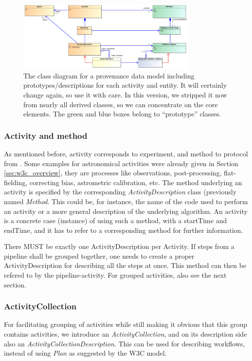 \begin{figure}
\centering
\includegraphics[width=0.8\textwidth]{ProvDM-classdiagram-prototypes.png}
\caption{The class diagram for a provenance data model including prototypes/descriptions for each activity and entity. It will certainly change again, so use it with care. In this version, we stripped it now from nearly all derived classes, so we can concentrate on the core elements. The green and blue boxes belong to ``prototype'' classes.}
\label{fig:classes-prototypes}
\end{figure}


\subsubsection{Activity and method}
As mentioned before, activity corresponds to experiment, and method to protocol from \cite{std:SimDM}.
Some examples for astronomical activities were already given in Section \ref{sec:w3c_overview}, they are processes like observations, post-processing, flat-fielding, correcting bias, astrometric calibration, etc. The method underlying an activity is specified by the corresponding \emph{ActivityDescription} class (previously named \emph{Method}. This could be, for instance, the name of the code used to perform an activity or a more general description of the underlying algorithm. An activity is a concrete case (instance) of using such a method, with a startTime and endTime, and it has to refer to a corresponding method for further information. 

There MUST be exactly one ActivityDescription per Activity. If steps from a pipeline shall be 
grouped together, one needs to create a proper ActivityDescription for describing all 
the steps at once. This method can then be refered to by the pipeline-activity. For grouped activities, also see the next section.

\subsubsection{ActivityCollection}
For facilitating grouping of activities while still making it obvious that this group contains activities, we introduce an \emph{ActivityCollection}, and on its description side also an \emph{ActivityCollectionDescription}. This can be used for describing workflows, instead of using \emph{Plan} as suggested by the W3C model.

